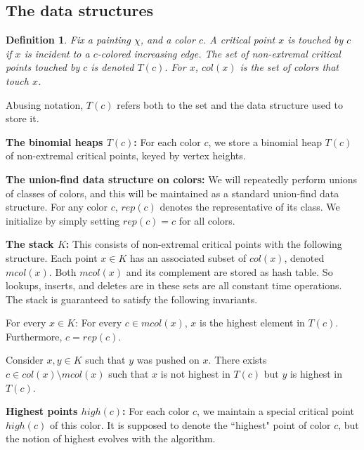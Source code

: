 \documentclass[11pt]{article}
\newtheorem{definition}[theorem]{Definition}
\theoremstyle{definition}
\newcommand{\col}{col}
\newcommand{\h}{high}
\newcommand{\mcol}{mcol}
\newcommand{\rep}{rep}
\newcommand{\st}{K}
\newcommand{\touch}{T}
\begin{document}
\subsection{The data structures} \label{sec:struct}

\begin{definition} \label{def:color-set} Fix a painting $\chi$, and a color $c$.
A critical point $x$ is \emph{touched by $c$} if $x$ is incident to a $c$-colored
increasing edge. The set of non-extremal critical points touched by $c$ is denoted $\touch(c)$.
For $x$, $\col(x)$ is the set of colors that touch $x$.
\end{definition}
%
Abusing notation, $\touch(c)$ refers
both to the set and the data structure used to store it.

\medskip
\noindent
{\bf The binomial heaps $\touch(c)$:} For each color $c$, we store a binomial
heap $T(c)$ of non-extremal critical points, keyed by vertex heights.

\medskip
\noindent
{\bf The union-find data structure on colors:} We will repeatedly perform unions
of classes of colors, and this will be maintained as a standard union-find data structure.
For any color $c$, $\rep(c)$ denotes the representative of its class. We initialize
by simply setting $\rep(c) = c$ for all colors.


\medskip
\noindent
{\bf The stack $\st$:} This consists of non-extremal critical points with the following structure.
Each point $x \in \st$ has an associated subset of $\col(x)$, denoted $\mcol(x)$.
Both $\mcol(x)$ and its complement are stored as hash table. So lookups, inserts, and deletes
are in these sets are all constant time operations. The stack is guaranteed to satisfy 
the following invariants.
\begin{asparaitem}
	\item For every $x \in \st$: For every $c \in \mcol(x)$, $x$ is the highest element
	in $T(c)$. Furthermore, $c = \rep(c)$.
	\item Consider $x, y \in \st$ such that $y$ was pushed on $x$. There exists $c \in \col(x) \setminus
	\mcol(x)$ such that $x$ is not highest in $T(c)$ but $y$ is highest in $T(c)$.
\end{asparaitem}

\medskip
\noindent
{\bf Highest points $\h(c)$:} For each color $c$, we maintain a special critical point $\h(c)$ of this color.
It is supposed to denote the ``highest" point of color $c$, but the notion of highest evolves
with the algorithm. 
\end{document}

